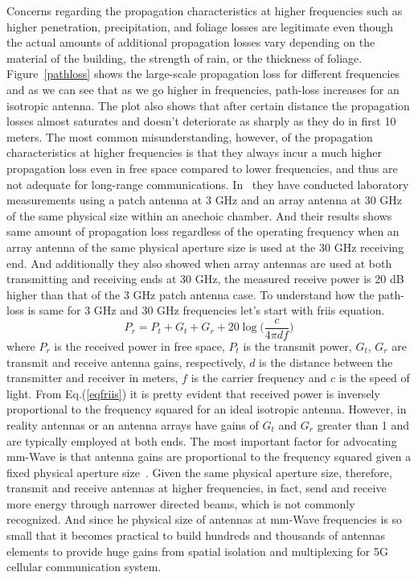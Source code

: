 Concerns regarding the propagation characteristics at higher frequencies such as higher penetration, precipitation, and foliage losses are legitimate even though the actual amounts of additional propagation losses vary depending on the material of the building, the strength of rain, or the thickness of foliage. Figure~\ref{pathloss} shows the large-scale propagation loss for different frequencies and as we can see that as we go higher in frequencies, path-loss increases for an isotropic antenna. The plot also shows that after certain distance the propagation losses almost saturates and doesn't deteriorate as sharply as they do in first 10 meters. The most common misunderstanding, however, of the propagation characteristics at higher frequencies is that they always incur a much higher propagation loss even in free space compared to lower frequencies, and thus are not adequate for long-range communications. In~\cite{6515173} they have conducted laboratory measurements using a patch antenna at 3 GHz and an array antenna at 30 GHz of the same physical size within an anechoic chamber. And their results shows same amount of propagation loss regardless of the operating frequency when an array antenna of the same physical aperture size is used at the 30 GHz receiving end. And additionally they also showed when array antennas are used at both transmitting and receiving ends at 30 GHz, the measured receive power is 20 dB higher than that of the 3 GHz patch antenna case. To understand how the path-loss is same for 3 GHz and 30 GHz frequencies let's start with friis equation.
\begin{equation}
\label{eqfriis}
P_r = P_t+G_t+G_r+20\log\bigg(\dfrac{c}{4\pi df}\bigg)
\end{equation}
where $P_r$ is the received power in free space, $P_t$ is the transmit power, $G_t$, $G_r$ are transmit and receive antenna gains, respectively, $d$ is the distance between the transmitter and receiver in meters, $f$ is the carrier frequency and $c$ is the speed of light. From Eq.(\ref{eqfriis}) it is pretty evident that received power is inversely proportional to the frequency squared for an ideal isotropic antenna. However, in reality antennas or an antenna arrays have gains of $G_t$ and $G_r$ greater than 1 and are typically employed at both ends. The most important factor for advocating mm-Wave is that antenna gains are proportional to the frequency squared given a fixed physical aperture size~\cite{friis1946note}. Given the same physical aperture size, therefore, transmit and receive antennas at higher frequencies, in fact, send and receive more energy through narrower directed beams, which is not commonly recognized. And since he physical size of antennas at mm-Wave frequencies is so small that it becomes practical to build hundreds and thousands of antennas elements to provide huge gains from spatial isolation and multiplexing for 5G cellular communication system.

